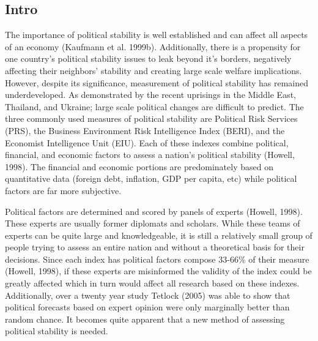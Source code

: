 \documentclass[12pt]{article}
\begin{document}
\begin{spacing}{1.5}

\section*{Intro}

The importance of political stability is well established and can affect all aspects of an economy (Kaufmann et al. 1999b). Additionally, there is a propensity for one country's political stability issues to leak beyond it's borders, negatively affecting their neighbors' stability and creating large scale welfare implications. However, despite its significance, measurement of political stability has remained underdeveloped. As demonstrated by the recent uprisings in the Middle East, Thailand, and Ukraine; large scale political changes are difficult to predict. The three commonly used measures of political stability are Political Risk Services (PRS), the Business Environment Risk Intelligence Index (BERI), and the Economist Intelligence Unit (EIU). Each of these indexes combine political, financial, and economic factors to assess a nation's political stability (Howell, 1998). The financial and economic portions are predominately based on quantitative data (foreign debt, inflation, GDP per capita, etc) while political factors are far more subjective. 

Political factors are determined and scored by panels of experts (Howell, 1998). These experts are usually former diplomats and scholars. While these teams of experts can be quite large and knowledgeable, it is still a relatively small group of people trying to assess an entire nation and without a theoretical basis for their decisions. Since each index has political factors compose 33-66\% of their measure (Howell, 1998), if these experts are misinformed the validity of the index could be greatly affected which in turn would affect all research based on these indexes. Additionally, over a twenty year study Tetlock (2005) was able to show that political forecasts based on expert opinion were only marginally better than random chance. It becomes quite apparent that a new method of assessing political stability is needed.  


\end{spacing}
\end{document}
